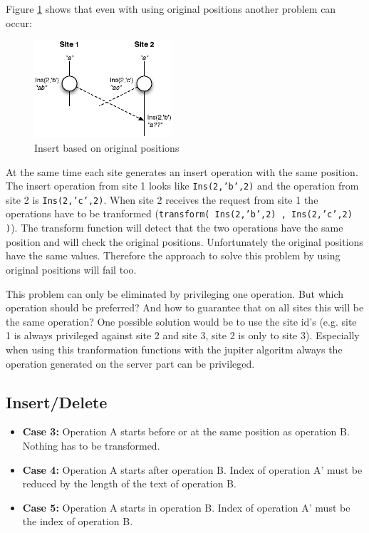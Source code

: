 \begin{itemize}
Figure \ref{Insert based on original positions} shows that even with using original positions another problem can occur:
\begin{figure}[H]
\centering
\includegraphics[height=3.63cm,width=5.13cm]{../../images/algo-impl/transform_ins_ins_origpos.eps}
\caption{Insert based on original positions}
\label{Insert based on original positions}
\end{figure}
At the same time each site generates an insert operation with the same position. The insert operation from site 1 looks like \texttt{Ins(2,'b',2)} and the operation from site 2 is \texttt{Ins(2,'c',2)}. When site 2 receives the request from site 1 the operations have to be tranformed (\texttt{transform( Ins(2,'b',2) , Ins(2,'c',2) )}). The transform function will detect that the two operations have the same position and will check the original positions. Unfortunately the original positions have the same values. Therefore the approach to solve this problem by using original positions will fail too.

This problem can only be eliminated by privileging one operation. But which operation should be preferred? And how to guarantee that on all sites this will be the same operation? One possible solution would be to use the site id's (e.g. site 1 is always privileged against site 2 and site 3, site 2 is only to site 3). Especially when using this tranformation functions with the jupiter algoritm always the operation generated on the server part can be privileged.
\end{itemize}

\subsection{Insert/Delete}
\begin{itemize}
\item \textbf{Case 3:}
Operation A starts before or at the same position as operation B. Nothing has to be transformed.
\item \textbf{Case 4:}
Operation A starts after operation B. Index of operation A' must be reduced by the length of the text of operation B.
\item \textbf{Case 5:}
Operation A starts in operation B. Index of operation A' must be the index of operation B.
\end{itemize}

